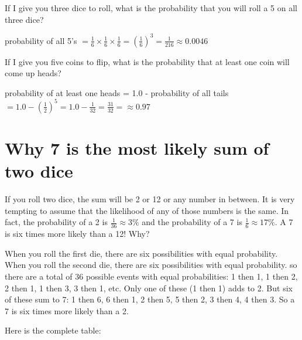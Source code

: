 \begin{Exercise}[title={Rolling Dice}, label=rolling-dice]
  If I give you three dice to roll, what is the
  probability that you will roll a 5 on all three dice?
\end{Exercise}
\begin{Answer}[ref=rolling-dice]
  probability of all 5's $ = \frac{1}{6}\times\frac{1}{6}\times\frac{1}{6} = \left(\frac{1}{6}\right)^3 = \frac{1}{216} \approx 0.0046$
  \end{Answer}
    
\begin{Exercise}[title={Flipping Coins}, label=flipping-coins]
  If I give you five coins to flip, what is the
  probability that at least one coin will come up heads?
\end{Exercise}
\begin{Answer}[ref=rolling-dice]
  probability of at least one heads = 1.0 - probability of all tails $ = 1.0 - \left(\frac{1}{2}\right)^5 =1.0 - \frac{1}{32} = \frac{31}{32} = \approx 0.97$ 
  \end{Answer}
    
\section{Why 7 is the most likely sum of two dice}

If you roll two dice, the sum will be 2 or 12 or any number in
between. It is very tempting to assume that the likelihood of any of
those numbers is the same. In fact, the probability of a 2 is
$\frac{1}{36} \approx 3\%$ and the probability of a 7 is $\frac{1}{6}
\approx 17\%$. A 7 is six times more likely than a 12! Why?

When you roll the first die, there are six possibilities with equal
probability. When you roll the second die, there are six possibilities
with equal probability. so there are a total of 36 possible events
with equal probabilities: 1 then 1, 1 then 2, 2 then 1, 1 then 3, 3
then 1, etc. Only one of these (1 then 1) adds to 2.  But six of these
sum to 7: 1 then 6, 6 then 1, 2 then 5, 5 then 2, 3 then 4, 4 then
3. So a 7 is six times more likely than a 2.

Here is the complete table:

